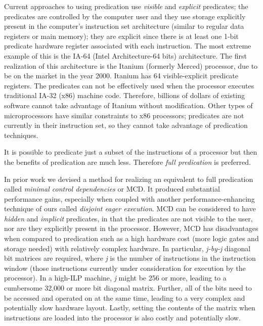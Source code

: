 \documentclass[10pt,dvips]{article}
\begin{document}
Current approaches to using predication use {\it visible} and {\it explicit}
predicates; the predicates are controlled by the computer user and they use
storage explicitly present in the computer's instruction set architecture
(similar to regular data registers or main memory); they are explicit since
there is at least one 1-bit predicate hardware
register associated with each instruction.
The most extreme example of
this is the IA-64 (Intel Architecture-64 bits) architecture. The first
realization of this architecture is the Itanium (formerly Merced)
processor, due to be on
the market in the year 2000. Itanium has 64 visible-explicit predicate
registers\cite{Intel99}.
The predicates can not be effectively used when the processor executes
traditional IA-32 (x86) machine code. Therefore, billions of dollars of
existing software cannot take advantage of Itanium without modification.
Other types of microprocessors have similar constraints to x86 processors;
predicates are not currently in their instruction set, so they cannot take
advantage of predication techniques. 

It is possible to predicate just a subset of the instructions of a processor
but then the benefits of predication are much less. Therefore {\it full predication}
is preferred.

In prior work\cite{Uht85c,Uht86,Uht91} we devised a method for realizing an
equivalent to full predication called {\it minimal control dependencies} or
MCD.
It produced substantial performance gains\cite{Uht91,Uht92}, especially when
coupled with another performance-enhancing technique of ours called
{\it disjoint eager execution}\cite{Uht95}. MCD can be considered to have
{\it hidden} and {\it implicit} predicates, in that the predicates are not
visible to the user, nor are they explicitly present in the processor.
However, MCD has disadvantages when compared to predication
such as a high hardware cost (more logic gates and storage
needed) with relatively complex hardware. In particular, {\it j-by-j}
diagonal bit matrices are required, where {\it j} is the number of instructions
in the instruction window (those instructions currently under consideration for
execution by the processor). In a high-ILP machine, {\it j} might
be 256 or more, leading to a cumbersome 32,000 or more bit diagonal matrix.
Further, all of the bits need to be accessed and operated on at the same time,
leading to a very complex and potentially slow hardware layout. Lastly, setting
the contents of the matrix when instructions are loaded into the processor is
also costly and potentially slow.
\end{document}
